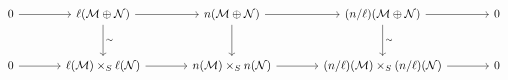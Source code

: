 \[\begin{tikzcd}[column sep=large,row sep=large]
0 \arrow[r] & \ell(\mathcal M\oplus\mathcal N) \arrow[r] \arrow[d,"\sim" right] & n(\mathcal M\oplus\mathcal N) \arrow[r] \arrow[d] & (n/\ell)(\mathcal M\oplus\mathcal N) \arrow[r] \arrow[d,"\sim" right] & 0\\
0 \arrow[r] & \ell(\mathcal M)\times_S\ell(\mathcal N) \arrow[r] & n(\mathcal M)\times_S n(\mathcal N) \arrow[r] & (n/\ell)(\mathcal M)\times_S(n/\ell)(\mathcal N) \arrow[r] & 0
\end{tikzcd}\]
